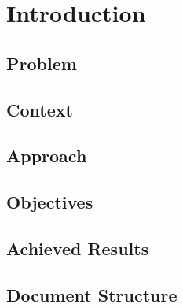 % 
\chapter{Introduction} %
\label{chap:Chapter1} %


%
\section{Problem}
\label{sec:problem}

\section{Context}
\label{sec:context}

\section{Approach}
\label{sec:approach}

\section{Objectives}
\label{sec:Oõbjectives}

\section{Achieved Results}
\label{sec:achieved_results}

\section{Document Structure}
\label{sec:document_structure}
